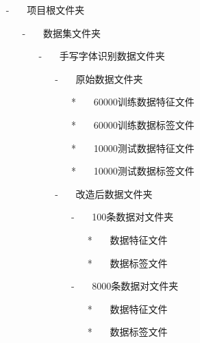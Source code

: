 \documentclass[UTF-8]{progbookcn}
\begin{document}
\begin{itemize}
      \item[-]  ~~~项目根文件夹
          \begin{itemize}
            \item[-] ~~~数据集文件夹
                \begin{itemize}
                  \item[-]  ~~~手写字体识别数据文件夹
                  \begin{itemize}
                    \item[-] ~~~原始数据文件夹
                    \begin{enumerate}
                        \item[*] ~~~60000训练数据特征文件
                        \item[*] ~~~60000训练数据标签文件
                        \item[*] ~~~10000测试数据特征文件
                        \item[*] ~~~10000测试数据标签文件
                      \end{enumerate}
                    \item[-] ~~~改造后数据文件夹
                    \begin{enumerate}
                      \item[-] ~~~100条数据对文件夹
                      \begin{enumerate}
                        \item[*] ~~~数据特征文件
                        \item[*] ~~~数据标签文件
                      \end{enumerate}
                      \item[-] ~~~8000条数据对文件夹
                      \begin{enumerate}
                        \item[*] ~~~数据特征文件
                        \item[*] ~~~数据标签文件

\end{enumerate}
\end{enumerate}
\end{itemize}
\end{itemize}
\end{itemize}
\end{itemize}
\end{document}
